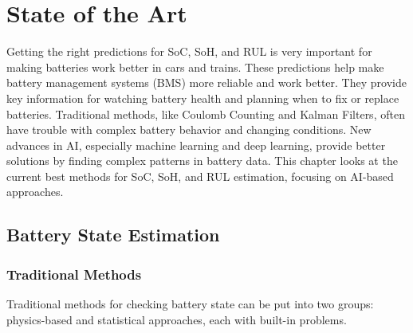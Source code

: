\chapter{State of the Art}
\label{ch:stateoftheart}
Getting the right predictions for SoC, SoH, and RUL is very important for making batteries work better in cars and trains. These predictions help make battery management systems (BMS) more reliable and work better. They provide key information for watching battery health and planning when to fix or replace batteries. Traditional methods, like Coulomb Counting and Kalman Filters, often have trouble with complex battery behavior and changing conditions. New advances in AI, especially machine learning and deep learning, provide better solutions by finding complex patterns in battery data. This chapter looks at the current best methods for SoC, SoH, and RUL estimation, focusing on AI-based approaches.

\section{Battery State Estimation}

\subsection{Traditional Methods}
\label{subsec:traditional_methods}
Traditional methods for checking battery state can be put into two groups: physics-based and statistical approaches, each with built-in problems.

